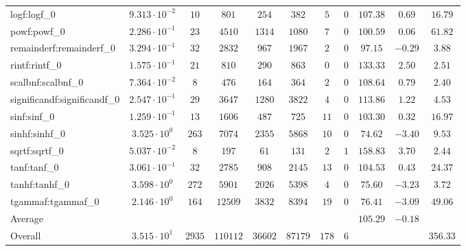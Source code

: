 \begin{tabular}{|l|c|c|c|c|c|c|c|c|c|c|}
logf:logf\_0                 & $ 9.313 \cdot 10^{-2} $ & $ 10     $ & $ 801    $ & $ 254   $ & $ 382   $ & $ 5   $ & $ 0 $ & $ 107.38      $ & $ 0.69    $ & $ 16.79   $ \\
powf:powf\_0                 & $ 2.286 \cdot 10^{-1} $ & $ 23     $ & $ 4510   $ & $ 1314  $ & $ 1080  $ & $ 7   $ & $ 0 $ & $ 100.59      $ & $ 0.06    $ & $ 61.82   $ \\
remainderf:remainderf\_0     & $ 3.294 \cdot 10^{-1} $ & $ 32     $ & $ 2832   $ & $ 967   $ & $ 1967  $ & $ 2   $ & $ 0 $ & $ 97.15       $ & $ -0.29   $ & $ 3.88    $ \\
rintf:rintf\_0               & $ 1.575 \cdot 10^{-1} $ & $ 21     $ & $ 810    $ & $ 290   $ & $ 863   $ & $ 0   $ & $ 0 $ & $ 133.33      $ & $ 2.50    $ & $ 2.51    $ \\
scalbnf:scalbnf\_0           & $ 7.364 \cdot 10^{-2} $ & $ 8      $ & $ 476    $ & $ 164   $ & $ 364   $ & $ 2   $ & $ 0 $ & $ 108.64      $ & $ 0.79    $ & $ 2.40    $ \\
significandf:significandf\_0 & $ 2.547 \cdot 10^{-1} $ & $ 29     $ & $ 3647   $ & $ 1280  $ & $ 3822  $ & $ 4   $ & $ 0 $ & $ 113.86      $ & $ 1.22    $ & $ 4.53    $ \\
sinf:sinf\_0                 & $ 1.259 \cdot 10^{-1} $ & $ 13     $ & $ 1606   $ & $ 487   $ & $ 725   $ & $ 11  $ & $ 0 $ & $ 103.30      $ & $ 0.32    $ & $ 16.97   $ \\
sinhf:sinhf\_0               & $ 3.525 \cdot 10^{0}  $ & $ 263    $ & $ 7074   $ & $ 2355  $ & $ 5868  $ & $ 10  $ & $ 0 $ & $ 74.62       $ & $ -3.40   $ & $ 9.53    $ \\
sqrtf:sqrtf\_0               & $ 5.037 \cdot 10^{-2} $ & $ 8      $ & $ 197    $ & $ 61    $ & $ 131   $ & $ 2   $ & $ 1 $ & $ 158.83      $ & $ 3.70    $ & $ 2.44    $ \\
tanf:tanf\_0                 & $ 3.061 \cdot 10^{-1} $ & $ 32     $ & $ 2785   $ & $ 908   $ & $ 2145  $ & $ 13  $ & $ 0 $ & $ 104.53      $ & $ 0.43    $ & $ 24.37   $ \\
tanhf:tanhf\_0               & $ 3.598 \cdot 10^{0}  $ & $ 272    $ & $ 5901   $ & $ 2026  $ & $ 5398  $ & $ 4   $ & $ 0 $ & $ 75.60       $ & $ -3.23   $ & $ 3.72    $ \\
tgammaf:tgammaf\_0           & $ 2.146 \cdot 10^{0}  $ & $ 164    $ & $ 12509  $ & $ 3832  $ & $ 8394  $ & $ 19  $ & $ 0 $ & $ 76.41       $ & $ -3.09   $ & $ 49.06   $ \\
\hline
Average                      & $                     $ & $        $ & $        $ & $       $ & $       $ & $     $ & $   $ & $ 105.29      $ & $ -0.18   $ & $         $ \\
\hline
Overall                      & $ 3.515 \cdot 10^{1}  $ & $ 2935   $ & $ 110112 $ & $ 36602 $ & $ 87179 $ & $ 178 $ & $ 6 $ & $             $ & $         $ & $ 356.33  $ \\
\hline
\end{tabular}
